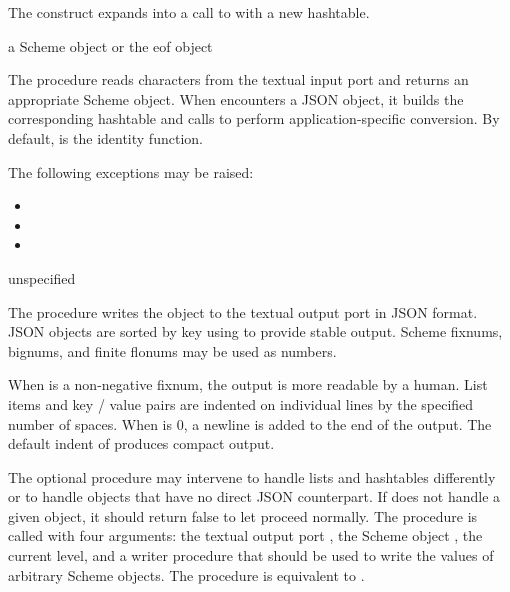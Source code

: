 \begin{syntax}
\end{syntax}

The  construct expands into a call to
 with a new hashtable.

\begin{procedure}
\end{procedure}
\returns{} a Scheme object or the eof object

The  procedure reads characters from the textual
input port  and returns an appropriate Scheme object.
When  encounters a JSON object, it builds
the corresponding hashtable and calls 
to perform application-specific conversion.
By default,  is the identity function.

The following exceptions may be raised:
\begin{itemize}
\item {}
\item {}
\item {}
\end{itemize}

\begin{procedure}
\end{procedure}
\returns{} unspecified

The  procedure writes the object  to the
textual output port  in JSON format. JSON objects are sorted
by key using  to provide stable output. Scheme fixnums,
bignums, and finite flonums may be used as numbers.

When  is a non-negative fixnum, the output is more readable
by a human. List items and key / value pairs are indented on
individual lines by the specified number of spaces. When 
is 0, a newline is added to the end of the output. The default indent
of  produces compact output.

The optional  procedure may intervene to handle
lists and hashtables differently or to handle objects that have no
direct JSON counterpart.  If  does not handle a
given object, it should return false to let  proceed
normally.  The  procedure is called with four
arguments: the textual output port , the Scheme object
, the current  level, and a writer procedure
 that should be used to write the values of arbitrary Scheme
objects.  The  procedure is equivalent to
.

